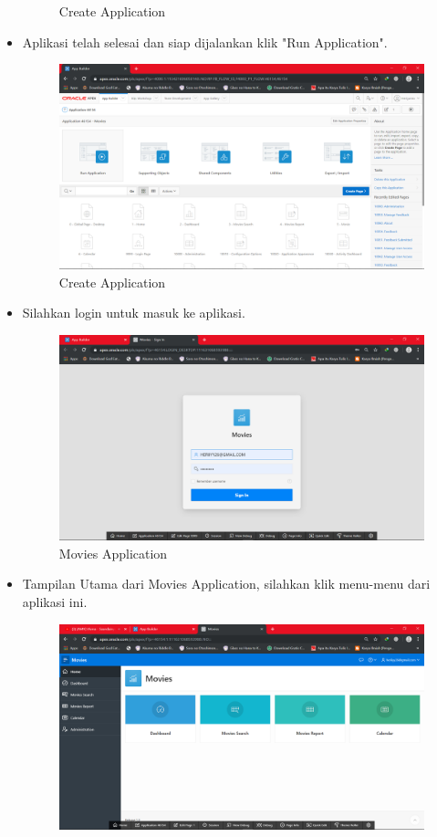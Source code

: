 \documentclass[12pt, times new roman]{article}
\begin{document}
\begin{itemize}
\begin{figure}[!htpb]
	\caption{Create Application}
\end{figure}
\item Aplikasi telah selesai dan siap dijalankan klik "Run Application".
\begin{figure}[!htpb]
	\centering
	\includegraphics[width=12cm]{figures/Screenshot_7.png}
	\caption{Create Application}
\end{figure}
\item Silahkan login untuk masuk ke aplikasi.
\begin{figure}[!htpb]
	\centering
	\includegraphics[width=12cm]{figures/Screenshot_8.png}
	\caption{Movies Application}
\end{figure}
\item Tampilan Utama dari Movies Application, silahkan klik menu-menu dari aplikasi ini.
\begin{figure}[!htpb]
	\centering
	\includegraphics[width=12cm]{figures/Screenshot_9.png}

\end{figure}
\end{itemize}
\end{document}
